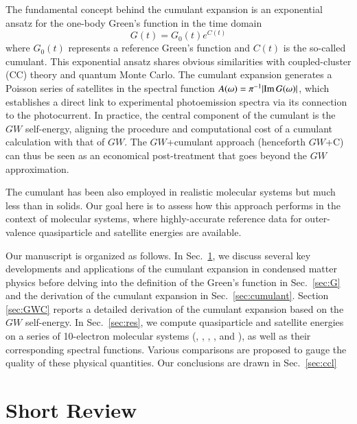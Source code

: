 \documentclass[aip,jcp,reprint,noshowkeys,superscriptaddress]{revtex4-2}
\begin{document}
The fundamental concept behind the cumulant expansion is an exponential ansatz for the one-body Green's function in the time domain
\begin{equation} \label{eq:cum}
	G(t) = G_0(t) e^{C(t)}
\end{equation}
where $G_0(t)$ represents a reference Green's function and $C(t)$ is the so-called cumulant. This exponential ansatz shares obvious similarities with coupled-cluster (CC) theory \cite{ShavittBook} and quantum Monte Carlo. \cite{Foulkes_2001,Austin_2012} The cumulant expansion generates a Poisson series of satellites in the spectral function $A(\omega) = \pi^{-1} \abs{\Im G(\omega)}$, which establishes a direct link to experimental photoemission spectra via its connection to the photocurrent. \cite{Almbladh_1983,Hedin_1999,Guzzo_2011,Guzzo_2014,Zhou_2015,Zhou_2018,Kas_2022a} 
In practice, the central component of the cumulant is the $GW$ self-energy, aligning the procedure and computational cost of a cumulant calculation with that of $GW$. 
The $GW$+cumulant approach (henceforth $GW$+C) can thus be seen as an economical post-treatment that goes beyond the $GW$ approximation.

The cumulant has been also employed in realistic molecular systems \cite{Vlcek_2018,Vila_2020,Vila_2021} 
but much less than in solids. 
Our goal here is to assess how this approach performs in the context of molecular systems, where highly-accurate reference data for outer-valence quasiparticle and satellite energies are available. \cite{Marie_2024}

Our manuscript is organized as follows. In Sec.~\ref{sec:review}, we discuss several key developments and applications of the cumulant expansion in condensed matter physics before delving into the definition of the Green's function in Sec.~\ref{sec:G} and the derivation of the cumulant expansion in Sec.~\ref{sec:cumulant}. Section \ref{sec:GWC} reports a detailed derivation of the cumulant expansion based on the $GW$ self-energy. In Sec.~\ref{sec:res}, we compute quasiparticle and satellite energies on a series of 10-electron molecular systems (, , , , and ), as well as their corresponding spectral functions. Various comparisons are proposed to gauge the quality of these physical quantities. Our conclusions are drawn in Sec.~\ref{sec:ccl}

\section{Short Review}
\label{sec:review}
\end{document}
